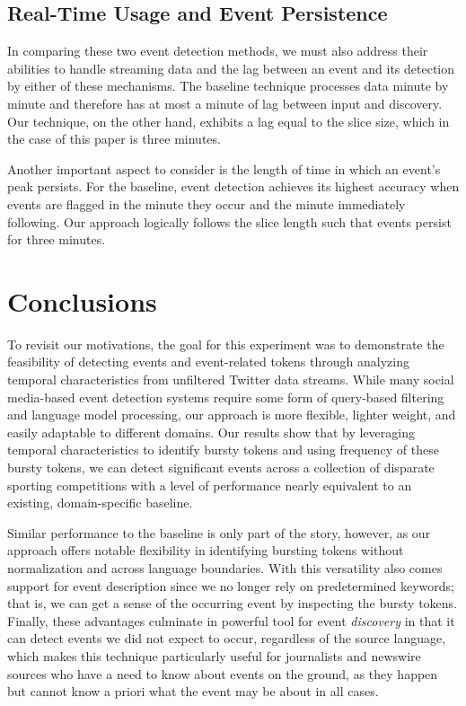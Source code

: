 \documentclass{acm_proc_article-sp}
\begin{document}
\subsection{Real-Time Usage and Event Persistence}

In comparing these two event detection methods, we must also address their abilities to handle streaming data and the lag between an event and its detection by either of these mechanisms.
The baseline technique processes data minute by minute and therefore has at most a minute of lag between input and discovery.
Our technique, on the other hand, exhibits a lag equal to the slice size, which in the case of this paper is three minutes.

Another important aspect to consider is the length of time in which an event's peak persists.
For the baseline, event detection achieves its highest accuracy when events are flagged in the minute they occur and the minute immediately following.
Our approach logically follows the slice length such that events persist for three minutes.

\section{Conclusions}

To revisit our motivations, the goal for this experiment was to demonstrate the feasibility of detecting events and event-related tokens through analyzing temporal characteristics from unfiltered Twitter data streams.
While many social media-based event detection systems require some form of query-based filtering and language model processing, our approach is more flexible, lighter weight, and easily adaptable to different domains.
Our results show that by leveraging temporal characteristics to identify bursty tokens and using frequency of these bursty tokens, we can detect significant events across a collection of disparate sporting competitions with a level of performance nearly equivalent to an existing, domain-specific baseline.

Similar performance to the baseline is only part of the story, however, as our approach offers notable flexibility in identifying bursting tokens without normalization and across language boundaries.
With this versatility also comes support for event description since we no longer rely on predetermined keywords; that is, we can get a sense of the occurring event by inspecting the bursty tokens.
Finally, these advantages culminate in powerful tool for event \emph{discovery} in that it can detect events we did not expect to occur, regardless of the source language, which makes this technique particularly useful for journalists and newswire sources who have a need to know about events on the ground, as they happen but cannot know a priori what the event may be about in all cases.
\end{document}

